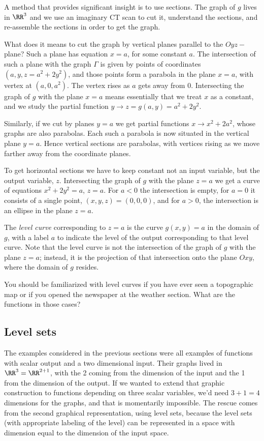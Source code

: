 A method that provides significant insight is to use
sections. The graph of $g$ lives in $\RR^3$ and we
use an imaginary CT scan to cut it, understand the
sections, and re-assemble the sections
in order to get the graph.

What does it means to cut the graph by vertical planes
parallel to the $Oyz-$plane? Such a plane has equation
$x=a$, for some constant $a$. The intersection of such
a plane with the graph $\Gamma$ is given by points of
coordinates $(a, y, z=a^2+2y^2)$, and those points form
a parabola in the plane $x=a$, with vertex at
$(a,0,a^2)$. The vertex rises as $a$ gets away from 0.
Intersecting the graph of $g$ with the plane $x=a$ means
essentially that we treat $x$ as a constant, and we study
the partial function $y\to z=g(a,y) = a^2+2y^2$.

Similarly, if we cut by planes $y=a$ we get partial
functions $x\to x^2+2a^2$, whose graphs are also
parabolas. Each such a parabola is now situated in the
vertical plane $y=a$. Hence vertical sections are
parabolas, with vertices rising as
we move farther away from the coordinate planes.

To get horizontal sections we have to
keep constant not an input variable, but the output
variable, $z$. Intersecting the graph of $g$ with
the plane $z=a$ we get a curve of equations $x^2+2y^2=a$,
$z=a$. For $a<0$ the intersection is empty, for $a=0$ it
consists of a single point, $(x,y,z) = (0,0,0)$, and for
$a>0$, the intersection is an ellipse in the plane $z=a$.

The \emph{level curve} corresponding to $z=a$ is the curve
$g(x,y)=a$ in the domain of $g$, with a label $a$ to
indicate the level of the output corresponding to
that level curve. Note that the level curve is not the
intersection of the graph of $g$ with the plane $z=a$;
instead, it is the projection of that intersection onto
the plane $Oxy$, where the domain of $g$ resides.

You should be familiarized with level curves if
you have ever seen a topographic map or if you
opened the newspaper at the weather section. What are the
functions in those cases?


\subsection{Level sets}
The examples considered in the previous sections were all
examples of functions with scalar output and a two
dimensional input. Their graphs lived in
$\RR^3 = \RR^{2+1}$, with the 2 coming from the dimension
of the input and the 1 from the dimension of the output.
If we wanted to extend that graphic construction to
functions depending on three scalar variables,
we'd need $3+1=4$ dimensions for the graphs, and that
is momentarily impossible. The rescue comes from the
second graphical representation, using level sets,
because the level sets (with appropriate labeling of
the level) can be represented in a space with dimension
equal to the dimension of the input space.


